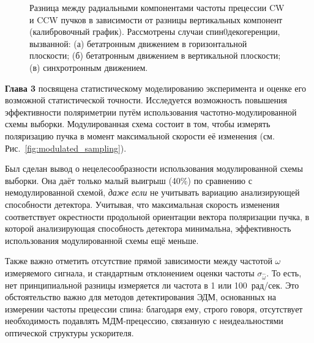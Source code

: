 \begin{figure}[H]
\begin{minipage}{.5\linewidth}
	\end{minipage}%
	\begin{minipage}{.5\linewidth}
	\caption{Разница между радиальными компонентами частоты прецессии CW и CCW пучков
		в зависимости от разницы вертикальных компонент (калибровочный график).\label{fig:calib}
		Рассмотрены случаи спин0декогеренции, вызванной:
	(а) бетатронным движением в горизонтальной плоскости; 
	(б) бетатронным движением в вертикальной плоскости;
	(в) синхротронным движением.
	}
	\end{minipage}
\end{figure}

\textbf{Глава 3} посвящена статистическому моделированию эксперимента 
и оценке его возможной статистической точности. Исследуется возможность повышения эффективности
поляриметрии путём использования частотно-модулированной схемы выборки. Модулированная схема 
состоит в том, чтобы измерять поляризацию пучка в момент максимальной скорости её изменения 
(см. Рис.~\ref{fig:modulated_sampling}).

Был сделан вывод о нецелесообразности использования модулированной схемы выборки. Она даёт только
малый выигрыш (40\%) по сравнению с немодулированной схемой, \emph{даже если} не учитывать вариацию 
анализирующей способности детектора. Учитывая, что максимальная скорость изменения соответствует
окрестности продольной ориентации вектора поляризации пучка, в которой анализирующая способность 
детектора минимальна, эффективность использования модулированной схемы ещё меньше.

Также важно отметить отсутствие прямой зависимости между частотой $\omega$ измеряемого сигнала, 
и стандартным отклонением оценки частоты $\sigma_{\hat\omega}$. То есть, нет принципиальной разницы
измеряется ли частота в 1 или 100~рад/сек. Это обстоятельство важно для методов детектирования ЭДМ, 
основанных на измерении частоты прецессии спина: благодаря ему, строго говоря, 
отсутствует необходимость подавлять МДМ-прецессию, связанную с неидеальностями 
оптической структуры ускорителя.

